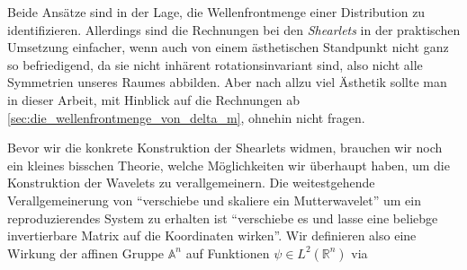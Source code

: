 
Beide Ansätze sind in der Lage, die Wellenfrontmenge einer Distribution zu identifizieren. Allerdings sind die Rechnungen bei den \textit{Shearlets} in der praktischen Umsetzung einfacher, wenn auch von einem ästhetischen Standpunkt nicht ganz so befriedigend, da sie nicht inhärent rotationsinvariant sind, also nicht alle Symmetrien unseres Raumes abbilden. Aber nach allzu viel Ästhetik sollte man in dieser Arbeit, mit Hinblick auf die Rechnungen ab \cref{sec:die_wellenfrontmenge_von_delta_m}, ohnehin nicht fragen.

Bevor wir die konkrete Konstruktion der Shearlets widmen, brauchen wir noch ein kleines bisschen Theorie, welche Möglichkeiten wir überhaupt haben, um die Konstruktion der Wavelets zu verallgemeinern. Die weitestgehende Verallgemeinerung von "`verschiebe und skaliere ein Mutterwavelet"' um ein reproduzierendes System zu erhalten ist "`verschiebe es und lasse eine beliebge invertierbare Matrix auf die Koordinaten wirken"'. Wir definieren also eine Wirkung der affinen Gruppe $\mathbb{A}^n$ auf Funktionen $\psi \in L^2(\mathbb{R}^n)$ via


